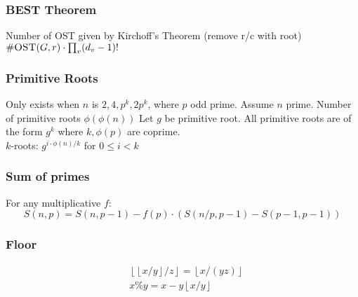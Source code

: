 \documentclass[9pt,a4paper,twocolumn,landscape,oneside]{amsart}
\begin{document}
\begin{multicols*}{3}
            \subsubsection{BEST Theorem}
                Number of OST given by Kirchoff's Theorem (remove r/c with root)
                $\#\textsc{OST}(G,r) \cdot \prod_{v}(d_v-1)!$

            \subsubsection{Primitive Roots}
                Only exists when $n$ is $2, 4, p^k, 2p^k$, where $p$ odd prime. Assume
                $n$ prime. Number of primitive roots $\phi(\phi(n))$
                Let $g$ be primitive root. All primitive roots are of the form $g^k$
                where $k,\phi(p)$ are coprime.\\ $k$-roots:
                $g^{i \cdot \phi(n) / k}$ for $0 \leq i < k$

            \subsubsection{Sum of primes} For any multiplicative $f$:
                \[
                    S(n,p) = S(n, p-1) - f(p) \cdot (S(n/p,p-1) - S(p-1,p-1))
                \]

            \subsubsection{Floor}
                \begin{align*}
                    &\left\lfloor \left\lfloor x/y \right\rfloor / z \right\rfloor = \left\lfloor x / (yz) \right\rfloor \\
                    &x \% y = x - y \left\lfloor x / y \right\rfloor
                \end{align*}



    \clearpage

\end{multicols*}
\end{document}
